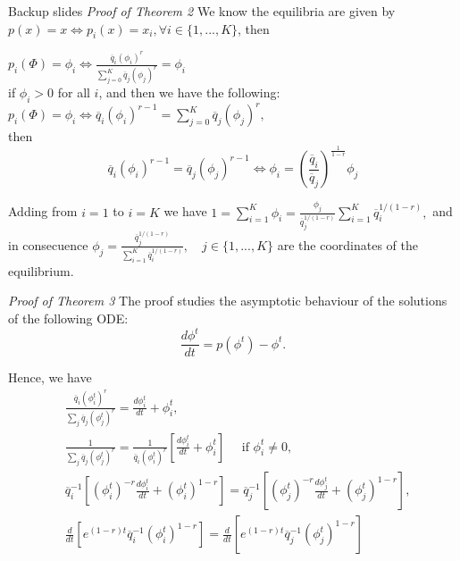 \addtocounter{framenumber}{-1}
{
\begin{frame}[c]{Backup slides} 
{\it Proof of Theorem 2}
We know the equilibria are given by $p(x)=x\Leftrightarrow p_i(x)=x_i, \forall i\in\{1,...,K\} $, then
	
	$p_i(\Phi)=\phi_i\Leftrightarrow \frac{\overline{q}_i(\phi_i)^r}{\sum_{j=0}^K\overline{q}_j(\phi_j)^r}=\phi_i$\\
	if  $\phi_i>0$ for all $i$, and then we have the following:
	$p_i(\Phi)=\phi_i\Leftrightarrow \overline{q}_i(\phi_i)^{r-1}=\sum_{j=0}^K\overline{q}_j(\phi_j)^r,$\\
	then 	\begin{equation*}
	\overline{q}_i(\phi_i)^{r-1}=\overline{q}_j(\phi_j)^{r-1}\Leftrightarrow \phi_i=\left(\frac{\overline{q}_i}{\overline{q}_j}\right)^{\frac{1}{1-r}}\phi_j
	\end{equation*}
	
	Adding from $i=1$ to $i=K$ we have
	$1=\sum_{i=1}^K\phi_i=\frac{\phi_j}{\overline{q}_j^{1/(1-r)}}\sum_{i=1}^K\overline{q}_i^{1/(1-r)},$
	and in consecuence
	$\phi_j=\frac{\overline{q}_j^{1/(1-r)}}{\sum_{i=1}^K\overline{q}_i^{1/(1-r)}},\quad j\in \{1,...,K\} $ are the coordinates of the equilibrium.

\end{frame}




\addtocounter{framenumber}{-1}
{
\begin{frame}[c]
{\it Proof of Theorem 3}
The proof studies the asymptotic behaviour of the solutions of the following ODE:
\begin{equation}
\label{ODEE}
\frac{d \phi^t}{dt}=p(\phi^t)-\phi^t.
\end{equation}

Hence, we have
\begin{align*}
&\frac{\overline{q}_i(\phi_i^t)^r}{\sum_j\overline{q}_j(\phi_j^t)^r}=\frac{d\phi_i^t}{d t}+\phi_i^t, \\
&\frac{1}{\sum_j\overline{q}_j(\phi_j^t)^r}=\frac{1}{\overline{q}_i(\phi_i^t)^r}[\frac{d\phi_i^t}{d t}+\phi_i^t] \quad \mbox{ if } \phi_i^t\neq 0,\\
&\overline{q}_i^{-1}[(\phi_i^t)^{-r}\frac{d\phi_i^t}{d t}+(\phi_i^t)^{1-r}]=\overline{q}_j^{-1}[(\phi_j^t)^{-r}\frac{d\phi_j^t}{d t}+(\phi_j^t)^{1-r}], \\
&\frac{d}{dt}\left[ e^{(1-r)t}\overline{q}_i^{-1}(\phi_i^t)^{1-r}\right]=\frac{d}{dt}\left[ e^{(1-r)t}\overline{q}_j^{-1}(\phi_j^t)^{1-r}\right]
\end{align*} 



\end{frame}
}




}\addtocounter{framenumber}{-1}
